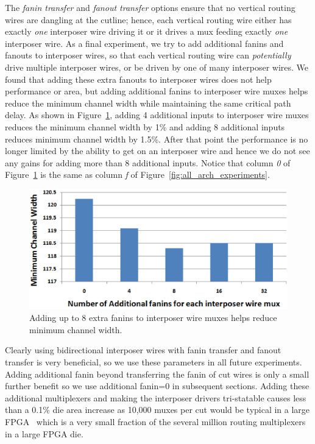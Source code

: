 \documentclass[journal]{IEEEtran}
\begin{document}
The \textit{fanin transfer} and \textit{fanout transfer} options ensure that no vertical routing wires are dangling at the cutline; hence, each vertical routing wire either has exactly \textit{one} interposer wire driving it or it drives a mux feeding exactly \textit{one} interposer wire. As a final experiment, we try to add additional fanins and fanouts to interposer wires, so that each vertical routing wire can \textit{potentially} drive multiple interposer wires, or be driven by one of many interposer wires. We found that adding these extra fanouts to interposer wires does not help performance or area, but adding additional fanins to interposer wire muxes helps reduce the minimum channel width while maintaining the same critical path delay. As shown in Figure~\ref{fig:additional_fanins}, adding 4 additional inputs to interposer wire muxes reduces the minimum channel width by 1\% and adding 8 additional inputs reduces minimum channel width by 1.5\%. After that point the performance is no longer limited by the ability to get on an interposer wire and hence we do not see any gains for adding more than 8 additional inputs. Notice that column \textit{0} of Figure~\ref{fig:additional_fanins} is the same as column \textit{f} of Figure~\ref{fig:all_arch_experiments}.

\begin{figure}[!h]
\centering
\includegraphics[width=\linewidth]{additional_fanins_2.eps}
\caption{Adding up to 8 extra fanins to interposer wire muxes helps reduce minimum channel width.}
\label{fig:additional_fanins}
\end{figure}

Clearly using bidirectional interposer wires with fanin transfer and fanout transfer is very beneficial, so we use these parameters in all future experiments. Adding additional fanin beyond transferring the fanin of cut wires is only a small further benefit so we use additional fanin=0 in subsequent sections. Adding these additional multiplexers and making the interposer drivers tri-statable causes less than a 0.1\% die area increase as 10,000 muxes per cut would be typical in a large FPGA~\cite{xilinx7series} which is a very small fraction of the several million routing multiplexers in a large FPGA die.
\end{document}
